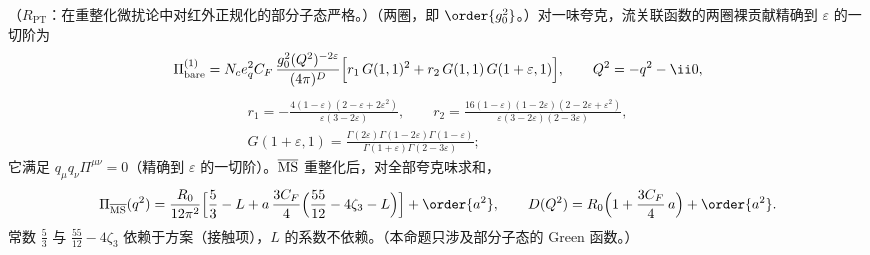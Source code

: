 \begin{proposition}\label{prop:ee-twoloop}
（$R_{\mathrm{PT}}$：在重整化微扰论中对红外正规化的部分子态严格。）（两圈，即 $\order{g_0^2}$。）对一味夸克，流关联函数的两圈裸贡献精确到 $\varepsilon$ 的一切阶为
\begin{equation}\label{eq:ee-Pi2bare}
\Pi^{(1)}_{\rm bare}=N_ce_q^2C_F\,\frac{g_0^2(Q^2)^{-2\varepsilon}}{(4\pi)^D}\Big[r_1\,G(1,1)^2+r_2\,G(1,1)\,G(1+\varepsilon,1)\Big],\qquad Q^2=-q^2-\ii0,
\end{equation}
\begin{gather*}
r_1=-\frac{4(1-\varepsilon)(2-\varepsilon+2\varepsilon^2)}{\varepsilon(3-2\varepsilon)},\qquad
r_2=\frac{16(1-\varepsilon)(1-2\varepsilon)(2-2\varepsilon+\varepsilon^2)}{\varepsilon(3-2\varepsilon)(2-3\varepsilon)},\\
G(1+\varepsilon,1)=\frac{\Gamma(2\varepsilon)\Gamma(1-2\varepsilon)\Gamma(1-\varepsilon)}{\Gamma(1+\varepsilon)\Gamma(2-3\varepsilon)} ;
\end{gather*}
它满足 $q_\mu q_\nu\Pi^{\mu\nu}=0$（精确到 $\varepsilon$ 的一切阶）。$\overline{\rm MS}$ 重整化后，对全部夸克味求和，
\begin{equation}\label{eq:ee-PiMSbar}
\Pi_{\overline{\rm MS}}(q^2)=\frac{R_0}{12\pi^2}\Big[\frac53-L+a\,\frac{3C_F}4\Big(\frac{55}{12}-4\zeta_3-L\Big)\Big]+\order{a^2},\qquad
D(Q^2)=R_0\Big(1+\frac{3C_F}4\,a\Big)+\order{a^2} .
\end{equation}
常数 $\frac53$ 与 $\frac{55}{12}-4\zeta_3$ 依赖于方案（接触项），$L$ 的系数不依赖。（本命题只涉及部分子态的 Green 函数。）
\end{proposition}
